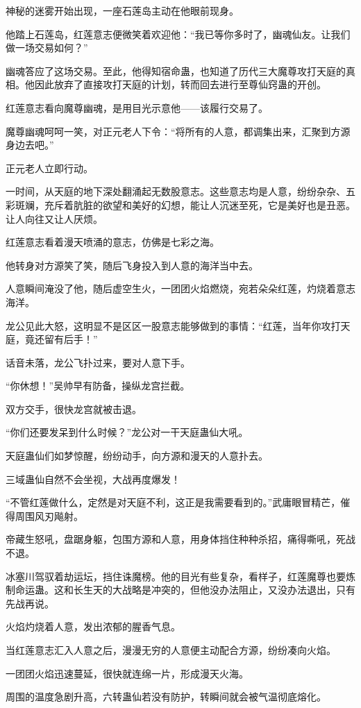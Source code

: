 \begin{this_body}
神秘的迷雾开始出现，一座石莲岛主动在他眼前现身。

他踏上石莲岛，红莲意志便微笑着欢迎他：“我已等你多时了，幽魂仙友。让我们做一场交易如何？”

幽魂答应了这场交易。至此，他得知宿命蛊，也知道了历代三大魔尊攻打天庭的真相。他因此放弃了直接攻打天庭的计划，转而回去进行至尊仙窍蛊的开创。

红莲意志看向魔尊幽魂，是用目光示意他——该履行交易了。

魔尊幽魂呵呵一笑，对正元老人下令：“将所有的人意，都调集出来，汇聚到方源身边去吧。”

正元老人立即行动。

一时间，从天庭的地下深处翻涌起无数股意志。这些意志均是人意，纷纷杂杂、五彩斑斓，充斥着肮脏的欲望和美好的幻想，能让人沉迷至死，它是美好也是丑恶。让人向往又让人厌烦。

红莲意志看着漫天喷涌的意志，仿佛是七彩之海。

他转身对方源笑了笑，随后飞身投入到人意的海洋当中去。

人意瞬间淹没了他，随后虚空生火，一团团火焰燃烧，宛若朵朵红莲，灼烧着意志海洋。

龙公见此大怒，这明显不是区区一股意志能够做到的事情：“红莲，当年你攻打天庭，竟还留有后手！”

话音未落，龙公飞扑过来，要对人意下手。

“你休想！”吴帅早有防备，操纵龙宫拦截。

双方交手，很快龙宫就被击退。

“你们还要发呆到什么时候？”龙公对一干天庭蛊仙大吼。

天庭蛊仙们如梦惊醒，纷纷动手，向方源和漫天的人意扑去。

三域蛊仙自然不会坐视，大战再度爆发！

“不管红莲做什么，定然是对天庭不利，这正是我需要看到的。”武庸眼冒精芒，催得周围风刃飚射。

帝藏生怒吼，盘踞身躯，包围方源和人意，用身体挡住种种杀招，痛得嘶吼，死战不退。

冰塞川驾驭着劫运坛，挡住诛魔榜。他的目光有些复杂，看样子，红莲魔尊也要炼制命运蛊。这和长生天的大战略是冲突的，但他没办法阻止，又没办法退出，只有先战再说。

火焰灼烧着人意，发出浓郁的腥香气息。

当红莲意志汇入人意之后，漫漫无穷的人意便主动配合方源，纷纷凑向火焰。

一团团火焰迅速蔓延，很快就连绵一片，形成漫天火海。

周围的温度急剧升高，六转蛊仙若没有防护，转瞬间就会被气温彻底熔化。


\end{this_body}
